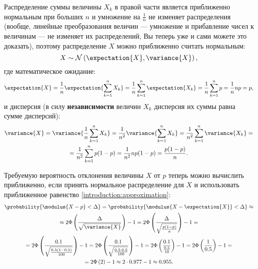 Распределение суммы величины $X_k$ в правой части является приближенно нормальным при больших $n$ и умножение на $\frac{1}{n}$ не изменяет распределения
(вообще, линейные преобразования величин --- умножение и прибавление чисел к величинам --- не изменяет их распределений, Вы теперь уже и сами можете это доказать),
поэтому распределение $X$ можно приближенно считать нормальным:
\begin{equation}
    X \sim \mathcal{N} \left ( \expectation{X}, \variance{X} \right ) ,
\end{equation}
где математическое ожидание:
\begin{equation}
    \label{1:expectation}
    \expectation{X}
    = \frac{1}{n} \expectation{\sum_{k=1}^n X_k}
    = \frac{1}{n} \sum_{k=1}^n \expectation{X_k}
    = \frac{1}{n} \sum_{k=1}^n p
    = \frac{1}{n} n p = p ,
\end{equation}
и дисперсия (в силу \textbf{независимости} величин $X_k$ дисперсия их суммы равна сумме дисперсий):
\begin{multline}
    \label{1:variance}
    \variance{X}
    = \variance{\frac{1}{n} \sum_{k=1}^n X_k}
    = \frac{1}{n^2} \variance{\sum_{k=1}^n X_k}
    = \frac{1}{n^2} \sum_{k=1}^n \variance{X_k} = \\
    = \frac{1}{n^2} \sum_{k=1}^n p(1-p)
    = \frac{1}{n^2} n p(1-p)
    = \frac{p(1-p)}{n} .
\end{multline}

Требуемую вероятность отклонения величины $X$ от $p$ теперь можно вычислить приближенно, если принять нормальное распределение для $X$ и использовать приближенное
равенство \eqref{introduction:approximation}:
\begin{multline}
    \probability{\modulus{X - p} < \Delta}
    = \probability{\modulus{X - \expectation{X}} < \Delta} \approx \\
    \approx 2 \Phi \left ( \frac{\Delta}{\sqrt{\variance{X}}} \right ) - 1
    = 2 \Phi \left ( \frac{\Delta}{\sqrt{\frac{p (1-p)}{n}}} \right ) - 1 = \\
    = 2 \Phi \left ( \frac{0.1}{\sqrt{\frac{0.5 (1-0.5)}{100}}} \right ) - 1
    = 2 \Phi \left ( \frac{0.1}{\sqrt{\frac{0.5 \cdot 0.5}{100}}} \right ) - 1
    = 2 \Phi \left ( \frac{0.1}{\frac{0.5}{10}} \right ) - 1
    = 2 \Phi \left ( \frac{1}{0.5} \right ) - 1 = \\
    = 2 \Phi \left ( 2 \right ) - 1
    \approx 2 \cdot 0.977 - 1
    \approx 0.955 .
\end{multline}

